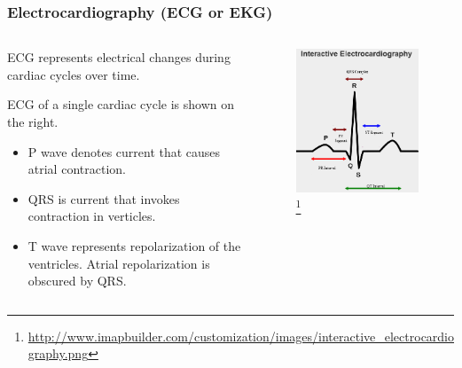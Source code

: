 \documentclass[xcolor=dvipsnames]{beamer}
\begin{document}
  \begin{frame}
    \frametitle{Electrocardiography (ECG or EKG)}
    \begin{columns}
      \begin{column}{0.5\textwidth}
        ECG represents electrical changes during cardiac cycles over time.

        ECG of a single cardiac cycle is shown on the right.

        \begin{itemize}
          \item P wave denotes current that causes atrial contraction.
          \item QRS is current that invokes contraction in verticles.
          \item T wave represents repolarization of the ventricles. Atrial repolarization is obscured by QRS.
        \end{itemize}

      \end{column}
      \begin{column}{0.5\textwidth}

        \begin{figure}
          \begin{center}
            \includegraphics[height=0.7 \textheight]{Figures/ecg.png}
            \footnote[frame]{\url{http://www.imapbuilder.com/customization/images/interactive\_electrocardiography.png}}
          \end{center}
        \end{figure}
      \end{column}
    \end{columns}
  \end{frame}
\end{document}
